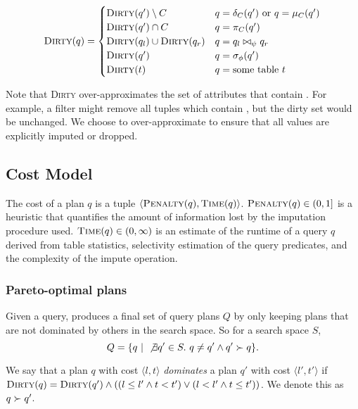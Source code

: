\begin{align*}
  \textsc{Dirty}(q) = \begin{cases}
    \textsc{Dirty}(q') \setminus C & q = \delta_C(q')\ \text{or}\ q = \mu_C(q') \\
    \textsc{Dirty}(q') \cap C & q = \pi_C(q') \\
    \textsc{Dirty}(q_l) \cup \textsc{Dirty}(q_r) & q = q_l \bowtie_\psi q_r \\
    \textsc{Dirty}(q') & q = \sigma_\phi(q') \\
    \textsc{Dirty}(t) & q = \text{some table}\ t \\
  \end{cases}
\end{align*}

Note that \textsc{Dirty} over-approximates the set of attributes that contain \nullv{}. For example, a filter might remove all tuples which contain \nullv{}, but the dirty set would be unchanged. We choose to over-approximate to ensure that all \nullv{} values are explicitly imputed or dropped.


\subsection{Cost Model}
\label{sec:cost-model}
The cost of a plan $q$ is a tuple $\langle \textsc{Penalty}(q), \textsc{Time}(q) \rangle$.
$\textsc{Penalty}(q) \in (0,1]$ is a heuristic that quantifies the amount of information lost by the imputation procedure used.
$\textsc{Time}(q) \in (0, \infty)$ is an estimate of the runtime of a query $q$ derived from table statistics, selectivity estimation of the query predicates, and the complexity of the
impute operation. 

\subsubsection{Pareto-optimal plans}
Given a query, \ProjectName{} produces a final set of query plans $Q$ by only keeping plans that are not dominated by others in the search space. So for a search space $S$, \[Q= \{ q ~|~ \not\exists q' \in S.\ q \neq q' \land q' \succ q \}.\]

\begin{definition}
We say that a plan $q$ with cost $\langle l, t \rangle$ \emph{dominates} a plan $q'$ with cost $\langle l', t' \rangle$ if $\textsc{Dirty}(q) = \textsc{Dirty}(q') \land ((l \leq l' \land t < t') \lor (l < l' \land t \leq t'))$. We denote this as $q \succ q'$. 
\end{definition}


